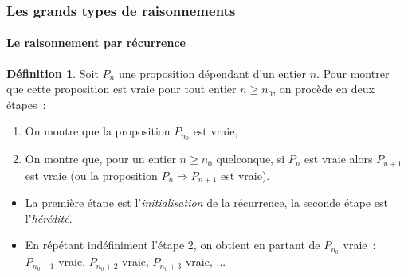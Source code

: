 \documentclass[10pt,notheorems]{beamer}
\theoremstyle{plain}
\theoremstyle{definition} %
\newtheorem{definition}{Définition}
\begin{document}
\begin{frame}
  \frametitle{Les grands types de raisonnements}
  \framesubtitle{Le raisonnement par récurrence}
  \hypertarget{slide_raisonnement_par_reccurence_1}{}

  \begin{definition}
    Soit $P_n$ une proposition dépendant d'un entier $n$. Pour montrer
    que cette proposition est vraie pour tout entier $n \geq n_0$, on procède en deux étapes~:
    \begin{enumerate}
    \item On montre que la proposition $P_{n_0}$ est vraie,
    \item On montre que, pour un entier $n\geq n_0$ quelconque, si $P_n$ est vraie alors $P_{n+1}$ est vraie (ou la proposition $P_n \Rightarrow P_{n+1}$ est vraie).
    \end{enumerate}
  \end{definition}

  \bigskip

  \begin{itemize}

  \item La première étape est l'\textit{initialisation} de la récurrence, la seconde étape est l'\textit{hérédité}.\newline
  \item En répétant indéfiniment l'étape 2, on obtient en partant de $P_{n_0}$ vraie~: $P_{n_0+1}$ vraie, $P_{n_0+2}$ vraie, $P_{n_0+3}$ vraie, ...

  \end{itemize}

\end{frame}
\end{document}
